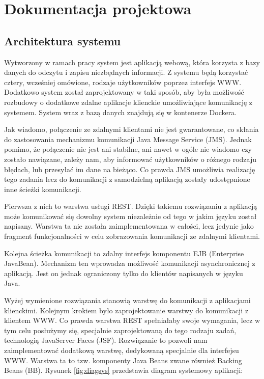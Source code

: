 \chapter{Dokumentacja projektowa}

\section{Architektura systemu}
Wytworzony w ramach pracy system jest aplikacją webową, która korzysta z bazy danych do odczytu i zapisu niezbędnych informacji. Z systemu będą korzystać cztery, wcześniej omówione, rodzaje użytkowników poprzez interfejs WWW. Dodatkowo system został zaprojektowany w taki sposób, aby była możliwość rozbudowy o dodatkowe zdalne aplikacje klienckie umożliwiające komunikację z systemem. System wraz z bazą danych znajdują się w kontenerze Dockera.

Jak wiadomo, połączenie ze zdalnymi klientami nie jest gwarantowane, co skłania do zastosowania mechanizmu komunikacji Java Message Service (JMS). Jednak pomimo, że połączenie nie jest ani stabilne, ani nawet w ogóle nie wiadomo czy zostało nawiązane, zależy nam, aby informować użytkowników o różnego rodzaju błędach, lub przesyłać im dane na bieżąco. Co prawda JMS umożliwia realizację tego zadania lecz do komunikacji z samodzielną aplikacją zostały udostępnione inne ścieżki komunikacji. 

Pierwsza z nich to warstwa usługi REST. Dzięki takiemu rozwiązaniu z aplikacją może komunikować się dowolny system niezależnie od tego w jakim języku został napisany. Warstwa ta nie została zaimplementowana w całości, lecz jedynie jako fragment funkcjonalności w celu zobrazowania komunikacji ze zdalnymi klientami.

Kolejna ścieżka komunikacji to zdalny interfejs komponentu EJB (Enterprise JavaBean). Mechanizm ten wprowadza możliwość komunikacji asynchronicznej z aplikacją. Jest on jednak ograniczony tylko do klientów napisanych w języku Java.

Wyżej wymienione rozwiązania stanowią warstwę do komunikacji z aplikacjami klienckimi. Kolejnym krokiem było zaprojektowanie warstwy do komunikacji z klientem WWW. Co prawda warstwa REST spełniałaby swoje wymagania, lecz w tym celu posłużymy się, specjalnie zaprojektowaną do tego rodzaju zadań, technologią JavaServer Faces (JSF). Rozwiązanie to pozwoli nam zaimplementować dodatkową warstwę, dedykowaną specjalnie dla interfejsu WWW. Warstwa ta to tzw. komponenty Java Beans zwane również Backing Beans (BB). Rysunek \ref{fig:diagsys} przedstawia diagram systemowy aplikacji:

